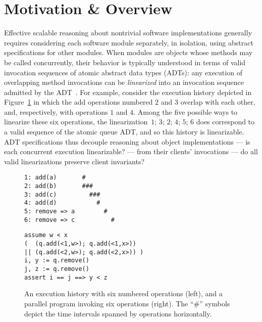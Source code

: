 \section{Motivation \& Overview}
\label{sec:motivation}

Effective scalable reasoning about nontrivial software implementations generally
requires considering each software module separately, in isolation, using
abstract specifications for other modules. When modules are objects whose
methods may be called concurrently, their behavior is typically understood in
terms of valid invocation sequences of atomic abstract data types (ADTs): any
execution of overlapping method invocations can be \emph{linearized} into an
invocation sequence admitted by the ADT~\cite{journals/toplas/HerlihyW90}. For
example, consider the execution history depicted in Figure~\ref{fig:clients} in
which the add operations numbered $2$ and $3$ overlap with each other, and,
respectively, with operations $1$ and $4$. Among the five possible ways to
linearize these six operations, the linearization~$1$; $3$; $2$; $4$; $5$; $6$
does correspond to a valid sequence of the atomic queue ADT, and so this history
is linearizable. ADT specifications thus decouple reasoning about object
implementations — is each concurrent execution linearizable? — from their
clients’ invocations — do all valid linearizations preserve client invariants?

\begin{figure}
  \begin{minipage}{0.43\linewidth}
    \begin{verbatim}
1: add(a)       #
2: add(b)       ###
3: add(c)         ###
4: add(d)           #
5: remove => a        #
6: remove => c          #
    \end{verbatim}
  \end{minipage}
  \hfill
  \begin{minipage}{0.55\linewidth}
    \begin{verbatim}
assume w < x
(  (q.add(<1,w>); q.add(<1,x>))
|| (q.add(<2,w>); q.add(<2,x>)) )
i, y := q.remove()
j, z := q.remove()
assert i == j ==> y < z
    \end{verbatim}
  \end{minipage}
  \caption{An execution history with six numbered operations (left),
    and a parallel program invoking six operations (right). The “\#” symbols
    depict the time intervals spanned by operations horizontally.}
  \label{fig:clients}
\end{figure}

